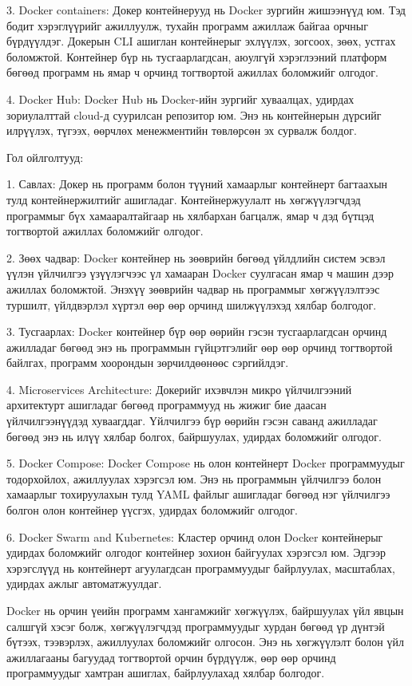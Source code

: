 			3. Docker containers: Докер контейнерууд нь Docker зургийн жишээнүүд юм. Тэд бодит хэрэглүүрийг ажиллуулж, тухайн программ ажиллаж байгаа орчныг бүрдүүлдэг. Докерын CLI ашиглан контейнерыг эхлүүлэх, зогсоох, зөөх, устгах боломжтой. Контейнер бүр нь тусгаарлагдсан, аюулгүй хэрэглээний платформ бөгөөд программ нь ямар ч орчинд тогтвортой ажиллах боломжийг олгодог.
			
			4. Docker Hub: Docker Hub нь Docker-ийн зургийг хуваалцах, удирдах зориулалттай cloud-д суурилсан репозитор юм. Энэ нь контейнерын дүрсийг илрүүлэх, түгээх, өөрчлөх менежментийн төвлөрсөн эх сурвалж болдог.
			
			Гол ойлголтууд:
			
			1. Савлах: Докер нь программ болон түүний хамаарлыг контейнерт багтаахын тулд контейнержилтийг ашигладаг. Контейнержуулалт нь хөгжүүлэгчдэд программыг бүх хамааралтайгаар нь хялбархан багцалж, ямар ч дэд бүтцэд тогтвортой ажиллах боломжийг олгодог.
			
			2. Зөөх чадвар: Docker контейнер нь зөөврийн бөгөөд үйлдлийн систем эсвэл үүлэн үйлчилгээ үзүүлэгчээс үл хамааран Docker суулгасан ямар ч машин дээр ажиллах боломжтой. Энэхүү зөөврийн чадвар нь программыг хөгжүүлэлтээс туршилт, үйлдвэрлэл хүртэл өөр өөр орчинд шилжүүлэхэд хялбар болгодог.
			
			3. Тусгаарлах: Docker контейнер бүр өөр өөрийн гэсэн тусгаарлагдсан орчинд ажилладаг бөгөөд энэ нь программын гүйцэтгэлийг өөр өөр орчинд тогтвортой байлгах, программ хоорондын зөрчилдөөнөөс сэргийлдэг.
			
			4. Microservices Architecture: Докерийг ихэвчлэн микро үйлчилгээний архитектурт ашигладаг бөгөөд программууд нь жижиг бие даасан үйлчилгээнүүдэд хуваагддаг. Үйлчилгээ бүр өөрийн гэсэн саванд ажилладаг бөгөөд энэ нь илүү хялбар болгох, байршуулах, удирдах боломжийг олгодог.
			
			5. Docker Compose: Docker Compose нь олон контейнерт Docker программуудыг тодорхойлох, ажиллуулах хэрэгсэл юм. Энэ нь программын үйлчилгээ болон хамаарлыг тохируулахын тулд YAML файлыг ашигладаг бөгөөд нэг үйлчилгээ болгон олон контейнер үүсгэх, удирдах боломжийг олгодог.
			
			6. Docker Swarm and Kubernetes: Кластер орчинд олон Docker контейнерыг удирдах боломжийг олгодог контейнер зохион байгуулах хэрэгсэл юм. Эдгээр хэрэгслүүд нь контейнерт агуулагдсан программуудыг байрлуулах, масштаблах, удирдах ажлыг автоматжуулдаг.
			
			Docker нь орчин үеийн программ хангамжийг хөгжүүлэх, байршуулах үйл явцын салшгүй хэсэг болж, хөгжүүлэгчдэд программуудыг хурдан бөгөөд үр дүнтэй бүтээх, тээвэрлэх, ажиллуулах боломжийг олгосон. Энэ нь хөгжүүлэлт болон үйл ажиллагааны багуудад тогтвортой орчин бүрдүүлж, өөр өөр орчинд программуудыг хамтран ашиглах, байрлуулахад хялбар болгодог.
	\pagebreak
